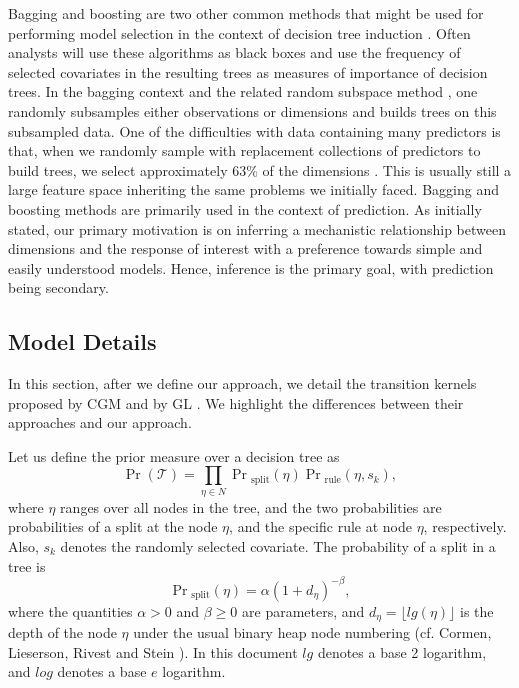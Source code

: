 Bagging and boosting are two other common methods that might be used for performing model selection in the context of decision tree induction \cite{breiman1996bagging} \cite{freund1999short}. Often analysts will use these algorithms as black boxes and use the frequency of selected covariates in the resulting trees as measures of importance of decision trees. In the bagging context and the related random subspace method \cite{ho1998random}, one randomly subsamples either observations or dimensions and builds trees on this subsampled data. One of the difficulties with data containing many predictors is that, when we randomly sample with replacement collections of predictors to build trees, we select approximately 63\% of the dimensions \cite{efron1997improvements}. This is usually still a large feature space inheriting the same problems we initially faced. %
 Bagging and boosting methods are primarily used in the context of prediction. As initially stated, our primary motivation is on inferring a mechanistic relationship between dimensions and the response of interest with a preference towards simple and easily understood models. Hence, inference is the primary goal, with prediction being secondary. 

\subsection{Model Details}\label{sec:model_details}

In this section, after we define our approach, we detail the transition kernels proposed by CGM \cite{chipman1998bayesian} and by GL \cite{gramacy2008bayesian}. We highlight the differences between their approaches and our approach. 

Let us define the prior measure over a decision tree as
\begin{equation} 
\Pr(\mathcal{T}) = \prod_{\eta\in N} \Pr{_{\text{split}}} (\eta) \Pr{_{\text{rule}}}(\eta,s_k),\nonumber
\end{equation}
where $\eta$ ranges over all nodes in the tree, and the two probabilities are probabilities of a split at the node $\eta$, and the specific rule at node $\eta$, respectively. Also, $s_k$ denotes the randomly selected covariate. The probability of a split in a tree is 
 \begin{equation}
 \Pr{_\text{split}}(\eta)= \alpha(1+d_\eta)^{-\beta},\nonumber
 \end{equation}
where the quantities $\alpha>0$ and $\beta\geq0$ are parameters, and $d_\eta = \lfloor lg(\eta)\rfloor$ is the depth of the node $\eta$ under the usual binary heap node numbering (cf. Cormen, Lieserson, Rivest and Stein \cite{cormen2001introduction}). In this document $lg$ denotes a base 2 logarithm, and $log$ denotes a base $e$ logarithm. 
  
